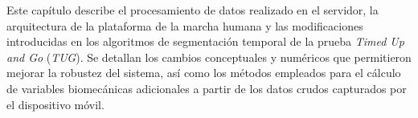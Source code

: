 \documentclass[12pt]{report}
\begin{document}
\begin{justify}
    Este capítulo describe el procesamiento de datos realizado en el servidor, la arquitectura de la plataforma de la marcha humana y las modificaciones introducidas en los algoritmos de segmentación temporal de la prueba \textit{Timed Up and Go} (\textit{TUG}). Se detallan los cambios conceptuales y numéricos que permitieron mejorar la robustez del sistema, así como los métodos empleados para el cálculo de variables biomecánicas adicionales a partir de los datos crudos capturados por el dispositivo móvil.














\end{justify}
\end{document}
